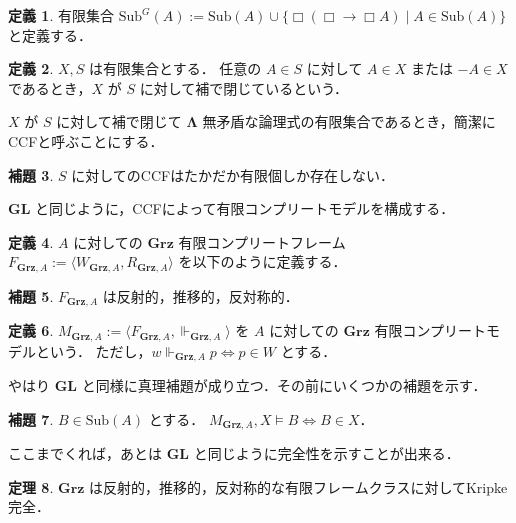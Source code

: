 \documentclass{jsarticle}
\newcommand*{\Logic}[1]{\mathbf{#1}}
\newcommand*{\LogicGL}{\Logic{GL}}
\newcommand*{\LogicGrz}{\Logic{Grz}}
\newcommand*{\Sub}[1]{\mathrm{Sub}(#1)}
\newcommand*{\structure}[1]{\langle #1 \rangle}
\theoremstyle{definition}
\newtheorem{theorem}{定理}[section]
\newtheorem{lemma}[theorem]{補題}
\newtheorem{definition}[theorem]{定義}
\begin{document}
\newcommand*{\GrzSub}[1]{\mathrm{Sub}^G(#1)}

\begin{definition}
	有限集合 $\GrzSub{A} := \Sub{A} \cup \{ \Box(\Box \to \Box A) \mid A \in \Sub{A} \}$ と定義する．
\end{definition}

\begin{definition}
	$X, S$ は有限集合とする．
	任意の $A \in S$ に対して $A \in X$ または $-A \in X$ であるとき，$X$ が $S$ に対して補で閉じているという．

	$X$ が $S$ に対して補で閉じて $\Logic{\Lambda}$ 無矛盾な論理式の有限集合であるとき，簡潔にCCFと呼ぶことにする．
\end{definition}

\begin{lemma}
	$S$ に対してのCCFはたかだか有限個しか存在しない．
\end{lemma}

$\LogicGL$ と同じように，CCFによって有限コンプリートモデルを構成する．
\begin{definition}
	$A$ に対しての $\LogicGrz$ 有限コンプリートフレーム $F_{\LogicGrz, A} := \structure{W_{\LogicGrz, A}, R_{\LogicGrz, A}}$ を以下のように定義する．
\end{definition}

\begin{lemma}
	$F_{\LogicGrz, A}$ は反射的，推移的，反対称的．
\end{lemma}

\begin{definition}
	$M_{\LogicGrz, A} := \structure{F_{\LogicGrz, A}, \Vdash_{\LogicGrz, A}}$ を $A$ に対しての $\LogicGrz$ 有限コンプリートモデルという．
	ただし，$w \Vdash_{\LogicGrz, A} p \iff p \in W$ とする．
\end{definition}

やはり $\LogicGL$ と同様に真理補題が成り立つ．その前にいくつかの補題を示す．

\begin{lemma}\label{lem:Grz_truthlemma}
	$B \in \Sub{A}$ とする．
	$M_{\LogicGrz, A}, X \vDash B \iff B \in X$．
\end{lemma}

ここまでくれば，あとは $\LogicGL$ と同じように完全性を示すことが出来る．

\begin{theorem}
	$\LogicGrz$ は反射的，推移的，反対称的な有限フレームクラスに対してKripke完全．
\end{theorem}
\end{document}

